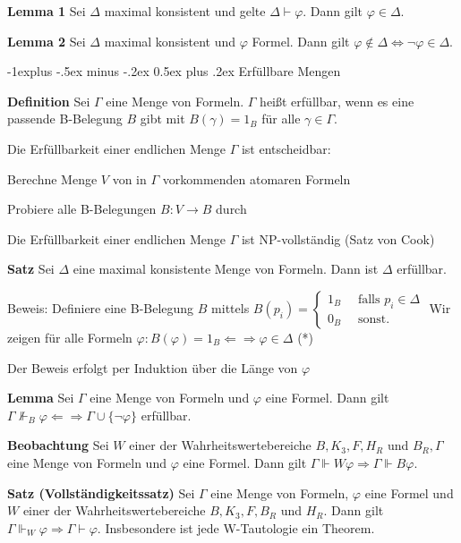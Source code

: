\documentclass[a4paper]{article}
\makeatletter
\renewcommand{\note}[2]{\begin{noteBox} \textbf{#1} #2 \end{noteBox}}
\renewcommand{\subsection}{\@startsection{subsection}{2}{0mm}%
                {-1explus -.5ex minus -.2ex}%
                {0.5ex plus .2ex}%
                {\normalfont\normalsize\bfseries}}
\makeatother
\begin{document}
\begin{multicols}{3}
  \note{Lemma 1}{Sei $\Delta$ maximal konsistent und gelte $\Delta\vdash\varphi$. Dann gilt $\varphi\in\Delta$.}

  \note{Lemma 2}{Sei $\Delta$ maximal konsistent und $\varphi$ Formel. Dann gilt $\varphi\not\in\Delta\Leftrightarrow\lnot\varphi\in\Delta$.}

  \subsection{Erfüllbare Mengen}
  \note{Definition}{Sei $\Gamma$ eine Menge von Formeln. $\Gamma$ heißt erfüllbar, wenn es eine passende B-Belegung $B$ gibt mit $B(\gamma) = 1_B$ für alle $\gamma\in\Gamma$.}
  \begin{itemize*}
    \item Die Erfüllbarkeit einer endlichen Menge $\Gamma$ ist entscheidbar:
    \item Berechne Menge $V$ von in $\Gamma$ vorkommenden atomaren Formeln
    \item Probiere alle B-Belegungen $B:V\rightarrow B$ durch
    \item Die Erfüllbarkeit einer endlichen Menge $\Gamma$ ist NP-vollständig (Satz von Cook)
  \end{itemize*}

  \note{Satz}{Sei $\Delta$  eine maximal konsistente Menge von Formeln. Dann ist $\Delta$ erfüllbar.}

  Beweis: Definiere eine B-Belegung $B$ mittels $B(p_i) = \begin{cases} 1_B \quad\text{ falls } p_i\in\Delta \\ 0_B \quad\text{ sonst. } \end{cases}$
  Wir zeigen für alle Formeln $\varphi: B(\varphi) = 1_B \Leftarrow\Rightarrow\varphi\in\Delta$ (*)

  Der Beweis erfolgt per Induktion über die Länge von $\varphi$

  \note{Lemma}{Sei $\Gamma$ eine Menge von Formeln und $\varphi$ eine Formel. Dann gilt $\Gamma\not\Vdash_B\varphi\Leftarrow\Rightarrow\Gamma\cup\{\lnot \varphi\}$ erfüllbar.}

  \note{Beobachtung}{Sei $W$ einer der Wahrheitswertebereiche $B, K_3, F, H_R$ und $B_R,\Gamma$ eine Menge von Formeln und $\varphi$ eine Formel. Dann gilt $\Gamma\Vdash W\varphi\Rightarrow\Gamma\Vdash B\varphi$.}

  \note{Satz (Vollständigkeitssatz)}{Sei $\Gamma$ eine Menge von Formeln, $\varphi$ eine Formel und $W$ einer der Wahrheitswertebereiche $B,K_3 , F, B_R$ und $H_R$. Dann gilt $\Gamma\Vdash_W\varphi \Rightarrow \Gamma\vdash\varphi$. Insbesondere ist jede W-Tautologie ein Theorem.}


\end{multicols}
\end{document}

